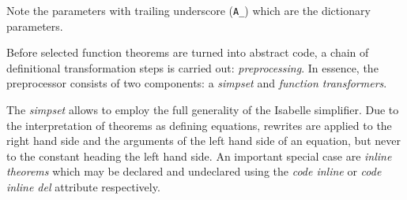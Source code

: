 \begin{isabellebody}
%
\endisatagquote
{\isafoldquote}%
%
\isadelimquote
%
\endisadelimquote
%
\begin{isamarkuptext}%
\noindent Note the parameters with trailing underscore (\verb|A_|)
    which are the dictionary parameters.%
\end{isamarkuptext}%
\isamarkuptrue%
%
\isamarkuptrue%
%
\begin{isamarkuptext}%
Before selected function theorems are turned into abstract
  code, a chain of definitional transformation steps is carried
  out: \emph{preprocessing}.  In essence, the preprocessor
  consists of two components: a \emph{simpset} and \emph{function transformers}.

  The \emph{simpset} allows to employ the full generality of the Isabelle
  simplifier.  Due to the interpretation of theorems
  as defining equations, rewrites are applied to the right
  hand side and the arguments of the left hand side of an
  equation, but never to the constant heading the left hand side.
  An important special case are \emph{inline theorems} which may be
  declared and undeclared using the
  \emph{code inline} or \emph{code inline del} attribute respectively.


\end{isamarkuptext}
\end{isabellebody}
